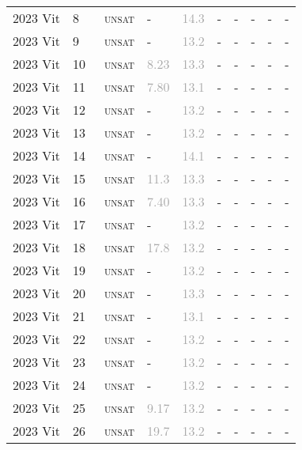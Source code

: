 \begin{center}
{\begin{longtable}{@{}llllllllll@{}}
2023 Vit & 8 & ~\textsc{unsat} & - & \textcolor{darkgray}{14.3} & - & - & - & - & - \\
2023 Vit & 9 & ~\textsc{unsat} & - & \textcolor{darkgray}{13.2} & - & - & - & - & - \\
2023 Vit & 10 & ~\textsc{unsat} & \textcolor{darkgray}{8.23} & \textcolor{darkgray}{13.3} & - & - & - & - & - \\
2023 Vit & 11 & ~\textsc{unsat} & \textcolor{darkgray}{7.80} & \textcolor{darkgray}{13.1} & - & - & - & - & - \\
2023 Vit & 12 & ~\textsc{unsat} & - & \textcolor{darkgray}{13.2} & - & - & - & - & - \\
2023 Vit & 13 & ~\textsc{unsat} & - & \textcolor{darkgray}{13.2} & - & - & - & - & - \\
2023 Vit & 14 & ~\textsc{unsat} & - & \textcolor{darkgray}{14.1} & - & - & - & - & - \\
2023 Vit & 15 & ~\textsc{unsat} & \textcolor{darkgray}{11.3} & \textcolor{darkgray}{13.3} & - & - & - & - & - \\
2023 Vit & 16 & ~\textsc{unsat} & \textcolor{darkgray}{7.40} & \textcolor{darkgray}{13.3} & - & - & - & - & - \\
2023 Vit & 17 & ~\textsc{unsat} & - & \textcolor{darkgray}{13.2} & - & - & - & - & - \\
2023 Vit & 18 & ~\textsc{unsat} & \textcolor{darkgray}{17.8} & \textcolor{darkgray}{13.2} & - & - & - & - & - \\
2023 Vit & 19 & ~\textsc{unsat} & - & \textcolor{darkgray}{13.2} & - & - & - & - & - \\
2023 Vit & 20 & ~\textsc{unsat} & - & \textcolor{darkgray}{13.3} & - & - & - & - & - \\
2023 Vit & 21 & ~\textsc{unsat} & - & \textcolor{darkgray}{13.1} & - & - & - & - & - \\
2023 Vit & 22 & ~\textsc{unsat} & - & \textcolor{darkgray}{13.2} & - & - & - & - & - \\
2023 Vit & 23 & ~\textsc{unsat} & - & \textcolor{darkgray}{13.2} & - & - & - & - & - \\
2023 Vit & 24 & ~\textsc{unsat} & - & \textcolor{darkgray}{13.2} & - & - & - & - & - \\
2023 Vit & 25 & ~\textsc{unsat} & \textcolor{darkgray}{9.17} & \textcolor{darkgray}{13.2} & - & - & - & - & - \\
2023 Vit & 26 & ~\textsc{unsat} & \textcolor{darkgray}{19.7} & \textcolor{darkgray}{13.2} & - & - & - & - & - \\

\end{longtable}}
\end{center}
